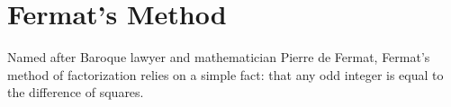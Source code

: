 \documentclass{report}
\newcommand{\colorA}{RoyalBlue}
\newcommand{\colorB}{PineGreen}
\newcommand{\colorC}{OrangeRed}
\begin{document}
\section{Fermat's Method}
Named after Baroque lawyer and mathematician Pierre de Fermat, Fermat's method of factorization
relies on a simple fact: that any odd integer is equal to the difference of squares.

\newcommand{\bdot}{\begin{tikzpicture} \fill[\colorA] (0,0) circle(3pt); \end{tikzpicture}}
\newcommand{\pdot}{\begin{tikzpicture} \fill[\colorB] (0,0) circle(3pt); \end{tikzpicture}}
\newcommand{\rdot}{\begin{tikzpicture} \fill[\colorC] (0,0) circle(3pt); \end{tikzpicture}}
\end{document}
